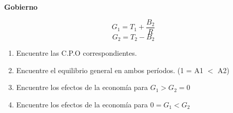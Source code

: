 \documentclass[a4paper,12pt]{article}
\begin{document}
\textbf{Gobierno}

\begin{equation*}
    G_1= T_1 + \frac{B_2}{R}
\end{equation*}
\begin{equation*}
    G_2= T_2 - B_2
\end{equation*}


\begin{enumerate}[label=\alph*)]
 \item Encuentre las C.P.O correspondientes. 
 \item Encuentre el equilibrio general en ambos períodos.
(1 = A1 $<$ A2)
\item  Encuentre los efectos de la economía para $G_1> G_2=0$
\item  Encuentre los efectos de la economía para $0=G_1<G_2$


\end{enumerate}
\end{document}
